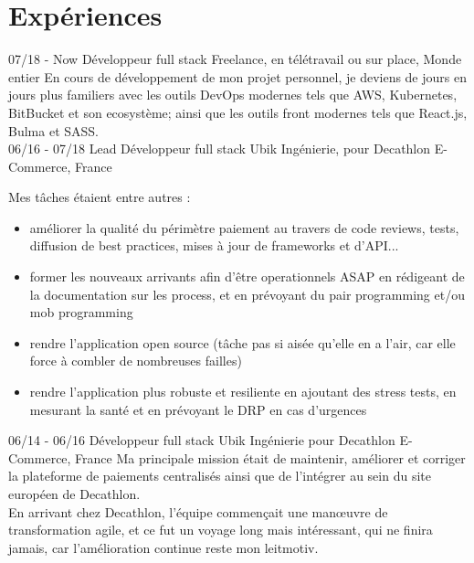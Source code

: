\documentclass[]{friggeri-cv}
\begin{document}
\section{Expériences}
\begin{entrylist}
  \entry
    {07/18 - Now}
    {Développeur full stack}
    {Freelance, en télétravail ou sur place, Monde entier}
    {En cours de développement de mon projet personnel, je deviens de jours en jours plus familiers avec les outils DevOps modernes tels que AWS, Kubernetes, BitBucket et son ecosystème; ainsi que les outils front modernes tels que React.js, Bulma et SASS.\\}
    \entry
    {06/16 - 07/18}
    {Lead Développeur full stack}
    {Ubik Ingénierie, pour Decathlon E-Commerce, France}
    {
Mes tâches étaient entre autres :
      \begin{itemize}
        \item améliorer la qualité du périmètre paiement au travers de code reviews, tests, diffusion de best practices, mises à jour de frameworks et d'API...
        \item former les nouveaux arrivants afin d'être operationnels ASAP en rédigeant de la documentation sur les process, et en prévoyant du pair programming et/ou mob programming
        \item rendre l'application open source (tâche pas si aisée qu'elle en a l'air, car elle force à combler de nombreuses failles)
        \item rendre l'application plus robuste et resiliente en ajoutant des stress tests, en mesurant la santé et en prévoyant le DRP en cas d'urgences
      \end{itemize}
}
    \entry
    {06/14 - 06/16}
    {Développeur full stack}
    {Ubik Ingénierie pour Decathlon E-Commerce, France}
    {Ma principale mission était de maintenir, améliorer et corriger la plateforme de paiements centralisés ainsi que de l'intégrer au sein du site européen de Decathlon.\\
En arrivant chez Decathlon, l'équipe commençait une man\oe uvre de transformation agile, et ce fut un voyage long mais intéressant, qui ne finira jamais, car l'amélioration continue reste mon leitmotiv.}
\end{entrylist}
\end{document}
